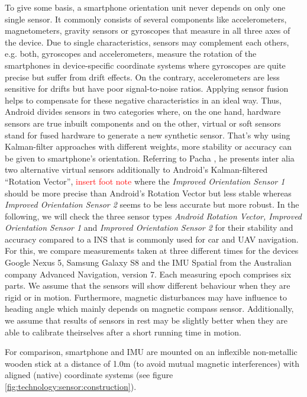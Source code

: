 \documentclass[review]{elsarticle}
\begin{document}
To give some basis, a smartphone orientation unit never depends on only one single sensor. It commonly consists of several components like accelerometers, magnetometers, gravity sensors or gyroscopes that measure in all three axes of the device. Due to single characteristics, sensors may complement each others, e.g. both, gyroscopes and accelerometers, measure the rotation of the smartphones in device-specific coordinate systems where gyroscopes are quite precise but suffer from drift effects. On the contrary, accelerometers are less sensitive for drifts but have poor signal-to-noise ratios. Applying sensor fusion helps to compensate for these negative characteristics in an ideal way. 
Thus, Android divides sensors in two categories where, on the one hand, hardware sensors are true inbuilt components and on the other, virtual or soft sensors stand for fused hardware to generate a new synthetic sensor. That's why using Kalman-filter approaches with different weights, more stability or accuracy can be given to smartphone's orientation. 
Referring to Pacha \cite{Pacha2015}, he presents inter alia two alternative virtual sensors additionally to Android's Kalman-filtered ``Rotation Vector'', \textcolor{red}{insert foot note} where the \textit{Improved Orientation Sensor 1} should be more precise than Android's Rotation Vector but less stable whereas \textit{Improved Orientation Sensor 2} seems to be less accurate but more robust. In the following, we will check the three sensor types \textit{Android Rotation Vector, Improved Orientation Sensor 1} and \textit{Improved Orientation Sensor 2} for their stability and accuracy compared to a \gls{INS} that is commonly used for car and \gls{UAV} navigation. For this, we compare measurements taken at three different times for the devices Google Nexus 5, Samsung Galaxy S8 and the \gls{IMU} Spatial from the Australian company Advanced Navigation, version 7. Each measuring epoch comprises six parts. We assume that the sensors will show different behaviour when they are rigid or in motion. Furthermore, magnetic disturbances may have influence to heading angle which mainly depends on magnetic compass sensor. Additionally, we assume that results of sensors in rest may be slightly better when they are able to calibrate theirselves after a short running time in motion. 

For comparison, smartphone and \gls{IMU} are mounted on an inflexible non-metallic wooden stick at a distance of 1.0m (to avoid mutual magnetic interferences) with aligned (native) coordinate systems (see figure \ref{fig:technology:sensor:construction}).
\end{document}
